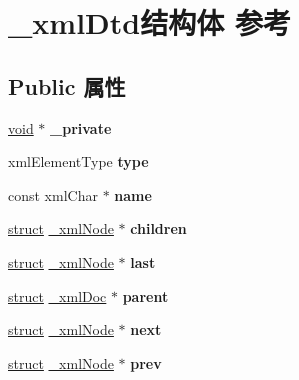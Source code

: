 \hypertarget{struct__xml_dtd}{}\section{\+\_\+xml\+Dtd结构体 参考}
\label{struct__xml_dtd}
\subsection*{Public 属性}
\begin{DoxyCompactItemize}
\item 
\mbox{\label{struct__xml_dtd_a61a1038a006bf0e6a5419c8c7ba31650}} 
\hyperlink{interfacevoid}{void} $\ast$ {\bfseries \+\_\+private}
\item 
\mbox{\label{struct__xml_dtd_a823418c1633bafc9bb653ddb4228bb1b}} 
xml\+Element\+Type {\bfseries type}
\item 
\mbox{\label{struct__xml_dtd_a956c542a2f8f36eca0d1ca732de4ffa1}} 
const xml\+Char $\ast$ {\bfseries name}
\item 
\mbox{\label{struct__xml_dtd_ad21db7d7c006d6f5b677cbc186794c92}} 
\hyperlink{interfacestruct}{struct} \hyperlink{struct__xml_node}{\+\_\+xml\+Node} $\ast$ {\bfseries children}
\item 
\mbox{\label{struct__xml_dtd_a987026be4bdc222950867088b9a773f3}} 
\hyperlink{interfacestruct}{struct} \hyperlink{struct__xml_node}{\+\_\+xml\+Node} $\ast$ {\bfseries last}
\item 
\mbox{\label{struct__xml_dtd_ae24fc717f1eea8d7de73adddc1ea9d98}} 
\hyperlink{interfacestruct}{struct} \hyperlink{struct__xml_doc}{\+\_\+xml\+Doc} $\ast$ {\bfseries parent}
\item 
\mbox{\label{struct__xml_dtd_a7a71339012cb16a7808dc669202434f6}} 
\hyperlink{interfacestruct}{struct} \hyperlink{struct__xml_node}{\+\_\+xml\+Node} $\ast$ {\bfseries next}
\item 
\mbox{\label{struct__xml_dtd_a22a38c614122e7ec48b593de6b7e7d03}} 
\hyperlink{interfacestruct}{struct} \hyperlink{struct__xml_node}{\+\_\+xml\+Node} $\ast$ {\bfseries prev}

\end{DoxyCompactItemize}
